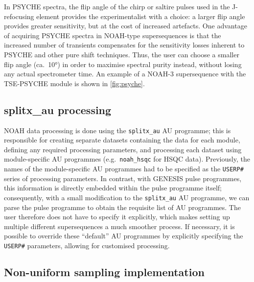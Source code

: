 \documentclass[a4paper,11pt]{article}
\newcommand{\carbon}{\ch{^{13}C}}
\begin{document}
\begin{refsection}
In PSYCHE spectra, the flip angle of the chirp or saltire pulses used in the J-refocusing element provides the experimentalist with a choice: a larger flip angle provides greater sensitivity, but at the cost of increased artefacts.\autocite{Foroozandeh2018CEJ}
One advantage of acquiring PSYCHE spectra in NOAH-type supersequences is that the increased number of transients compensates for the sensitivity losses inherent to PSYCHE and other pure shift techniques.
Thus, the user can choose a smaller flip angle (ca.\ \ang{10}) in order to maximise spectral purity instead, without losing any actual spectrometer time.
An example of a NOAH-3 supersequence with the TSE-PSYCHE module is shown in \cref{fig:psyche}.

\subsection{splitx\_au processing}
\label{subsec:splitx_au}

NOAH data processing is done using the \texttt{splitx\_au} AU programme; this is responsible for creating separate datasets containing the data for each module, defining any required processing parameters, and processing each dataset using module-specific AU programmes (e.g.\ \texttt{noah\_hsqc} for \carbon{} HSQC data).
Previously, the names of the module-specific AU programmes had to be specified as the \texttt{USERP\#} series of processing parameters.
In contrast, with GENESIS pulse programmes, this information is directly embedded within the pulse programme itself; consequently, with a small modification to the \texttt{splitx\_au} AU programme, we can parse the pulse programme to obtain the requisite list of AU programmes.
The user therefore does not have to specify it explicitly, which makes setting up multiple different supersequences a much smoother process.
If necessary, it is possible to override these ``default'' AU programmes by explicitly specifying the \texttt{USERP\#} parameters, allowing for customised processing.

\subsection{Non-uniform sampling implementation}
\label{subsec:nus}


\end{refsection}
\end{document}
